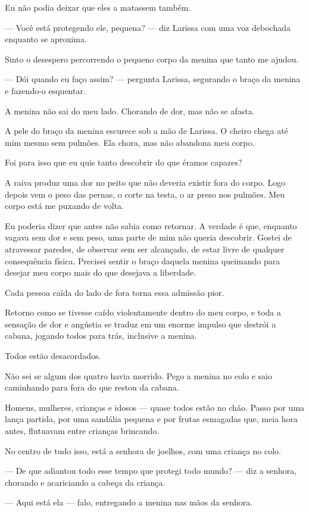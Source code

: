 Eu não podia deixar que eles a matassem também.

— Você está protegendo ele, pequena? — diz Larissa com uma voz debochada enquanto se aproxima.

Sinto o desespero percorrendo o pequeno corpo da menina que tanto me ajudou.

— Dói quando eu faço assim? — pergunta Larissa, segurando o braço da menina e fazendo-o esquentar.

A menina não sai do meu lado.  
Chorando de dor, mas não se afasta.

A pele do braço da menina escurece sob a mão de Larissa. O cheiro chega até mim mesmo sem pulmões. Ela chora, mas não abandona meu corpo.

Foi para isso que eu quis tanto descobrir do que éramos capazes?

A raiva produz uma dor no peito que não deveria existir fora do corpo. Logo depois vem o peso das pernas, o corte na testa, o ar preso nos pulmões. Meu corpo está me puxando de volta.

Eu poderia dizer que antes não sabia como retornar. A verdade é que, enquanto vagava sem dor e sem peso, uma parte de mim não queria descobrir. Gostei de atravessar paredes, de observar sem ser alcançado, de estar livre de qualquer consequência física. Precisei sentir o braço daquela menina queimando para desejar meu corpo mais do que desejava a liberdade.

Cada pessoa caída do lado de fora torna essa admissão pior.

Retorno como se tivesse caído violentamente dentro do meu corpo, e toda a sensação de dor e angústia se traduz em um enorme impulso que destrói a cabana, jogando todos para trás, inclusive a menina.

Todos estão desacordados.

Não sei se algum dos quatro havia morrido.  
Pego a menina no colo e saio caminhando para fora do que restou da cabana.

Homens, mulheres, crianças e idosos — quase todos estão no chão. Passo por uma lança partida, por uma sandália pequena e por frutas esmagadas que, meia hora antes, flutuavam entre crianças brincando.

No centro de tudo isso, está a senhora de joelhos, com uma criança no colo.

— De que adiantou todo esse tempo que protegi todo mundo? — diz a senhora, chorando e acariciando a cabeça da criança.

— Aqui está ela — falo, entregando a menina nas mãos da senhora.

